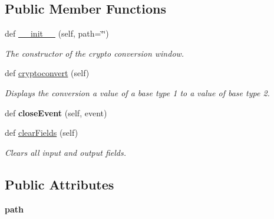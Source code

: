 \subsection*{Public Member Functions}
\begin{DoxyCompactItemize}
\item 
def \hyperlink{class_conversion_crypto__ui_1_1_conversion_crypto_window_a2c076dd5a4c7905c9e8898ace06516ad}{\+\_\+\+\_\+init\+\_\+\+\_\+} (self, path=\char`\"{}\char`\"{})
\begin{DoxyCompactList}\small\item\em The constructor of the crypto conversion window. \end{DoxyCompactList}\item 
def \hyperlink{class_conversion_crypto__ui_1_1_conversion_crypto_window_a1348e819d5c05e07ccf156235ba333e9}{cryptoconvert} (self)
\begin{DoxyCompactList}\small\item\em Displays the conversion a value of a base type 1 to a value of base type 2. \end{DoxyCompactList}\item 
\mbox{\label{class_conversion_crypto__ui_1_1_conversion_crypto_window_acde9f773c8b7d602583783e5eff85760}} 
def {\bfseries close\+Event} (self, event)
\item 
\mbox{\label{class_conversion_crypto__ui_1_1_conversion_crypto_window_a5918c0af343a4ad48a6251533d8eb1cf}} 
def \hyperlink{class_conversion_crypto__ui_1_1_conversion_crypto_window_a5918c0af343a4ad48a6251533d8eb1cf}{clear\+Fields} (self)
\begin{DoxyCompactList}\small\item\em Clears all input and output fields. \end{DoxyCompactList}\end{DoxyCompactItemize}
\subsection*{Public Attributes}
\begin{DoxyCompactItemize}
\item 
\mbox{\label{class_conversion_crypto__ui_1_1_conversion_crypto_window_af293f3d2991869ffc4859104d09dde98}} 
{\bfseries path}
\end{DoxyCompactItemize}



